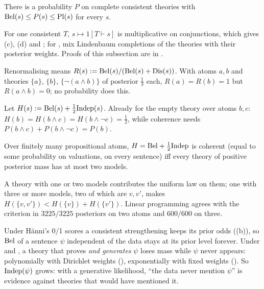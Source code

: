 \begin{proposition}\label{prop:sound:bracket}
There is a probability $P$ on complete consistent theories with $\mathrm{Bel}(s)\le P(s)\le\mathrm{Pl}(s)$ for every $s$.
\end{proposition}

\noindent For one consistent $T$, $s\mapsto1[T\vdash s]$ is multiplicative on conjunctions, which gives (c), (d) and ; for , mix Lindenbaum completions of the theories with their posterior weights. Proofs of this subsection are in .

\begin{example}\label{ex:sound:renorm}
Renormalising means $R(s):=\mathrm{Bel}(s)/(\mathrm{Bel}(s)+\mathrm{Dis}(s))$. With atoms $a,b$ and theories $\{a\}$, $\{b\}$, $\{\neg(a\wedge b)\}$ of posterior $\tfrac13$ each, $R(a)=R(b)=1$ but $R(a\wedge b)=0$; no probability does this.
\end{example}

\begin{example}\label{ex:sound:fifty}
Let $H(s):=\mathrm{Bel}(s)+\tfrac12\mathrm{Indep}(s)$. Already for the empty theory over atoms $b,c$: $H(b)=H(b\wedge c)=H(b\wedge\neg c)=\tfrac12$, while coherence needs $P(b\wedge c)+P(b\wedge\neg c)=P(b)$.
\end{example}

\begin{proposition}\label{prop:sound:fiftyfifty}
Over finitely many propositional atoms, $H=\mathrm{Bel}+\tfrac12\mathrm{Indep}$ is coherent (equal to some probability on valuations, on every sentence) iff every theory of positive posterior mass has at most two models.
\end{proposition}

\noindent A theory with one or two models contributes the uniform law on them; one with three or more models, two of which are $v,v'$, makes $H(\{v,v'\})<H(\{v\})+H(\{v'\})$. Linear programming agrees with the criterion in $3225/3225$ posteriors on two atoms and $600/600$ on three.

\begin{remark}\label{rem:sound:indep}
Under H\"anni's 0/1 scores a consistent strengthening keeps its prior odds ((b)), so $\mathrm{Bel}$ of a sentence $\psi$ independent of the data stays at its prior level forever. Under \Lzero{} and \Lone, a theory that proves \emph{and generates} $\psi$ loses mass while $\psi$ never appears: polynomially with Dirichlet weights (), exponentially with fixed weights (). So $\mathrm{Indep}(\psi)$ grows: with a generative likelihood, ``the data never mention $\psi$'' is evidence against theories that would have mentioned it.
\end{remark}

